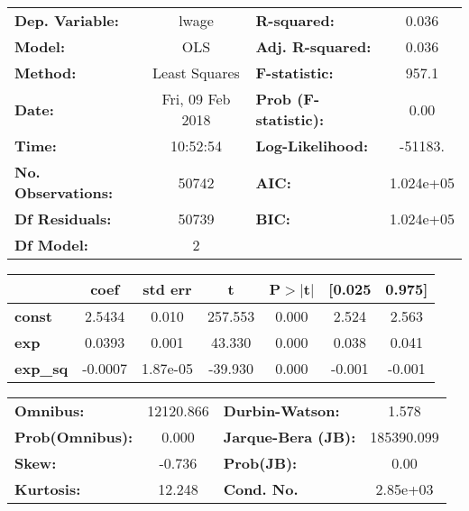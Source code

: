 \begin{center}
\begin{tabular}{lclc}
\toprule
\textbf{Dep. Variable:}    &      lwage       & \textbf{  R-squared:         } &     0.036   \\
\textbf{Model:}            &       OLS        & \textbf{  Adj. R-squared:    } &     0.036   \\
\textbf{Method:}           &  Least Squares   & \textbf{  F-statistic:       } &     957.1   \\
\textbf{Date:}             & Fri, 09 Feb 2018 & \textbf{  Prob (F-statistic):} &     0.00    \\
\textbf{Time:}             &     10:52:54     & \textbf{  Log-Likelihood:    } &   -51183.   \\
\textbf{No. Observations:} &       50742      & \textbf{  AIC:               } & 1.024e+05   \\
\textbf{Df Residuals:}     &       50739      & \textbf{  BIC:               } & 1.024e+05   \\
\textbf{Df Model:}         &           2      & \textbf{                     } &             \\
\bottomrule
\end{tabular}
\begin{tabular}{lcccccc}
                 & \textbf{coef} & \textbf{std err} & \textbf{t} & \textbf{P$>$$|$t$|$} & \textbf{[0.025} & \textbf{0.975]}  \\
\midrule
\textbf{const}   &       2.5434  &        0.010     &   257.553  &         0.000        &        2.524    &        2.563     \\
\textbf{exp}     &       0.0393  &        0.001     &    43.330  &         0.000        &        0.038    &        0.041     \\
\textbf{exp\_sq} &      -0.0007  &     1.87e-05     &   -39.930  &         0.000        &       -0.001    &       -0.001     \\
\bottomrule
\end{tabular}
\begin{tabular}{lclc}
\textbf{Omnibus:}       & 12120.866 & \textbf{  Durbin-Watson:     } &     1.578   \\
\textbf{Prob(Omnibus):} &    0.000  & \textbf{  Jarque-Bera (JB):  } & 185390.099  \\
\textbf{Skew:}          &   -0.736  & \textbf{  Prob(JB):          } &      0.00   \\
\textbf{Kurtosis:}      &   12.248  & \textbf{  Cond. No.          } &  2.85e+03   \\
\bottomrule
\end{tabular}
\end{center}